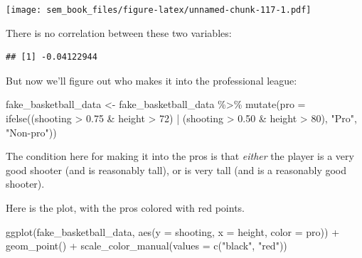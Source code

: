\documentclass[
]{book}
\newenvironment{Shaded}{\begin{snugshade}}{\end{snugshade}}
\newcommand{\AttributeTok}[1]{\textcolor[rgb]{0.77,0.63,0.00}{#1}}
\newcommand{\DecValTok}[1]{\textcolor[rgb]{0.00,0.00,0.81}{#1}}
\newcommand{\FloatTok}[1]{\textcolor[rgb]{0.00,0.00,0.81}{#1}}
\newcommand{\FunctionTok}[1]{\textcolor[rgb]{0.00,0.00,0.00}{#1}}
\newcommand{\NormalTok}[1]{#1}
\newcommand{\OtherTok}[1]{\textcolor[rgb]{0.56,0.35,0.01}{#1}}
\newcommand{\SpecialCharTok}[1]{\textcolor[rgb]{0.00,0.00,0.00}{#1}}
\newcommand{\StringTok}[1]{\textcolor[rgb]{0.31,0.60,0.02}{#1}}
\begin{document}
\texttt{[image: sem\_book\_files/figure-latex/unnamed-chunk-117-1.pdf]}

There is no correlation between these two variables:

\begin{Shaded}
\end{Shaded}

\begin{verbatim}
## [1] -0.04122944
\end{verbatim}

But now we'll figure out who makes it into the professional league:

\begin{Shaded}
\begin{Highlighting}[]
\NormalTok{fake\_basketball\_data }\OtherTok{\textless{}{-}}\NormalTok{ fake\_basketball\_data }\SpecialCharTok{\%\textgreater{}\%}
    \FunctionTok{mutate}\NormalTok{(}\AttributeTok{pro =} \FunctionTok{ifelse}\NormalTok{((shooting }\SpecialCharTok{\textgreater{}} \FloatTok{0.75} \SpecialCharTok{\&}\NormalTok{ height }\SpecialCharTok{\textgreater{}} \DecValTok{72}\NormalTok{) }\SpecialCharTok{|}
\NormalTok{                        (shooting }\SpecialCharTok{\textgreater{}} \FloatTok{0.50} \SpecialCharTok{\&}\NormalTok{ height }\SpecialCharTok{\textgreater{}} \DecValTok{80}\NormalTok{),}
                        \StringTok{"Pro"}\NormalTok{, }\StringTok{"Non{-}pro"}\NormalTok{))}
\end{Highlighting}
\end{Shaded}

The condition here for making it into the pros is that \emph{either} the player is a very good shooter (and is reasonably tall), or is very tall (and is a reasonably good shooter).

Here is the plot, with the pros colored with red points.

\begin{Shaded}
\begin{Highlighting}[]
\FunctionTok{ggplot}\NormalTok{(fake\_basketball\_data,}
       \FunctionTok{aes}\NormalTok{(}\AttributeTok{y =}\NormalTok{ shooting, }\AttributeTok{x =}\NormalTok{ height, }\AttributeTok{color =}\NormalTok{ pro)) }\SpecialCharTok{+}
    \FunctionTok{geom\_point}\NormalTok{() }\SpecialCharTok{+}
    \FunctionTok{scale\_color\_manual}\NormalTok{(}\AttributeTok{values =} \FunctionTok{c}\NormalTok{(}\StringTok{"black"}\NormalTok{, }\StringTok{"red"}\NormalTok{))}
\end{Highlighting}
\end{Shaded}
\end{document}
